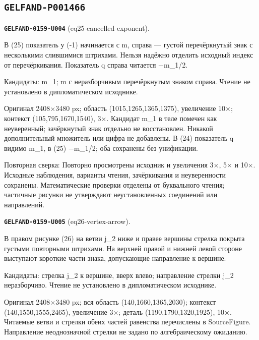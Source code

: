\subsection*{\texttt{GELFAND-P001466}}
\par\noindent\leavevmode{}\label{GELFAND-0159-U004}\label{GELFAND-P001466:eq25-cancelled-exponent}\textbf{\texttt{GELFAND-0159-U004}} (eq25-cancelled-exponent).\nopagebreak[4]\par
В (25) показатель у (-1) начинается с m, справа — густой перечёркнутый знак с несколькими слившимися штрихами. Нельзя надёжно отделить исходный индекс от перечёркивания. Показатель q справа читается −m\_1/2.\par
Кандидаты: m\_1; m с неразборчивым перечёркнутым знаком справа. Чтение не установлено в дипломатическом исходнике.\par
Оригинал 2408×3480 px; область (1015,1265,1365,1375), увеличение 10×; контекст (105,795,1670,1540), 3×. Кандидат m\_1 в теле помечен как неуверенный; зачёркнутый знак отдельно не восстановлен. Никакой дополнительный множитель или цифра не добавлены. В (24) показатель q видимо m\_1, в (25) −m\_1/2; оба сохранены без унификации.\par
Повторная сверка: Повторно просмотрены исходник и увеличения 3×, 5× и 10×. Исходные наблюдения, варианты чтения, зачёркивания и неуверенности сохранены. Математические проверки отделены от буквального чтения; частичные рисунки не утверждают неустановленных соединений или направлений.\par\medskip
\par\noindent\leavevmode{}\label{GELFAND-0159-U005}\label{GELFAND-P001466:eq26-vertex-arrow}\textbf{\texttt{GELFAND-0159-U005}} (eq26-vertex-arrow).\nopagebreak[4]\par
В правом рисунке (26) на ветви j\_2 ниже и правее вершины стрелка покрыта густыми повторными штрихами. На верхней правой и нижней левой стороне выступают короткие части знака, допускающие направление к вершине.\par
Кандидаты: стрелка j\_2 к вершине, вверх влево; направление стрелки j\_2 неразборчиво. Чтение не установлено в дипломатическом исходнике.\par
Оригинал 2408×3480 px; вся область (140,1660,1365,2030); контекст (140,1550,1555,2465), увеличение 3×; деталь (1190,1790,1320,1925), 10×. Читаемые ветви и стрелки обеих частей равенства перечислены в SourceFigure. Направление неоднозначной стрелки не задано по алгебраическому ожиданию.\par
